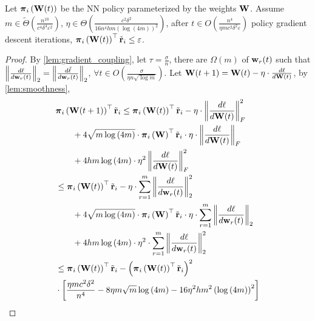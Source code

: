 \begin{thm}
\label{thm:regret_convergence}
    Let ${\boldsymbol{\pi}}_i\left( {\mathbf{W}}(t) \right)$ be the NN policy parameterized by the weights ${\mathbf{W}}$. Assume $m \in \tilde{\Theta}\left( \frac{n^{10}}{c^4 \delta^4 \varepsilon^2} \right)$, $\eta \in \Theta\left( \frac{c^2 \delta^2}{16 n^4 h m \left( \log{\left(4m\right)} \right)^2} \right)$, after $t \in O\left( \frac{n^4}{\eta m c^2 \delta^2 \varepsilon} \right)$ policy gradient descent iterations, ${\boldsymbol{\pi}}_i\left( {\mathbf{W}}(t) \right)^\top {\tilde{\mathbf{r}}}_i \le \varepsilon$.
\end{thm}
\begin{proof}
    By \cref{lem:gradient_coupling}, let $\tau = \frac{\sigma}{n}$, there are $\Omega\left( m \right)$ of ${\mathbf{w}}_r(t)$ such that $\left\| \frac{d\ell}{d {\mathbf{w}}_r(t)} \right\|_2 = \left\| \frac{d\tilde{\ell}}{d {\mathbf{w}}_r(t)} \right\|_2$, $\forall t \in O\left( \frac{\sigma}{\eta n \sqrt{\log{m}}} \right)$. Let ${\mathbf{W}}(t+1) = {\mathbf{W}}(t) - \eta \cdot \frac{d \ell}{d {\mathbf{W}}(t)}$, by \cref{lem:smoothness},
\begin{equation*}
\begin{split}
    &\rvpi_i\left( \rmW(t+1) \right)^\top \rvtilder_i \le \rvpi_i\left( \rmW(t) \right)^\top \rvtilder_i - \eta \cdot \left\| \frac{d \ell}{d \rmW(t)} \right\|_F^2 \\
    &\qquad + 4 \sqrt{m \log{\left(4m\right)}} \cdot \rvpi_i\left( \rmW \right)^\top \rvtilder_i \cdot \eta \cdot \left\| \frac{d \ell}{d \rmW(t)} \right\|_F \\
    &\qquad + 4 h m \log{\left(4m\right)} \cdot \eta^2 \left\| \frac{d \ell}{d \rmW(t)} \right\|_F^2 \\
    &\le \rvpi_i\left( \rmW(t) \right)^\top \rvtilder_i - \eta \cdot \sum\limits_{r=1}^{m}{ \left\| \frac{d\ell}{d \rvw_r(t)} \right\|_2^2 } \\
    &\qquad + 4 \sqrt{m \log{\left(4m\right)}} \cdot \rvpi_i\left( \rmW \right)^\top \rvtilder_i \cdot \eta \cdot \sum\limits_{r=1}^{m}{ \left\| \frac{d\ell}{d \rvw_r(t)} \right\|_2 } \\
    &\qquad + 4 h m \log{\left(4m\right)} \cdot \eta^2 \cdot \sum\limits_{r=1}^{m}{ \left\| \frac{d\ell}{d \rvw_r(t)} \right\|_2^2 } \\
    &\le \rvpi_i\left( \rmW(t) \right)^\top \rvtilder_i - \left( \rvpi_i\left( \rmW(t) \right)^\top \rvtilder_i \right)^2 \\
    &\cdot \left[ \frac{\eta m c^2 \delta^2}{n^4} - 8 \eta m \sqrt{m} \log{\left(4m\right)} - 16 \eta^2 h m^2 \left( \log{\left(4m\right)} \right)^2 \right] \\

\end{split}
\end{equation*}
\end{proof}
